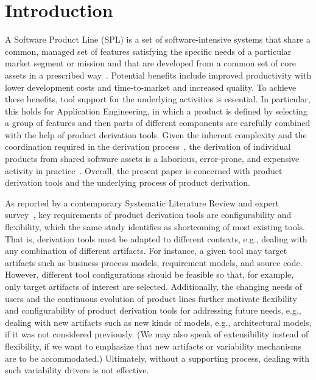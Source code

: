 
\section{Introduction}
\label{introduction}



A Software Product Line (SPL) is a set of software-intensive systems that share a common, managed set of features satisfying the specific needs of a particular market segment or mission and that are developed from a common set of core assets in a prescribed way~\cite{spl-book}. Potential benefits include improved productivity with lower development costs and time-to-market and increased quality. To achieve these benefits, tool support for the underlying activities is essential. In particular, this holds for Application Engineering, in which a product is defined by selecting a group of features and then parts of different components are carefully combined with the help of product derivation tools. Given the inherent complexity and the coordination required in the derivation process~\cite{griss}, the derivation of individual products from shared software assets is a laborious, error-prone, and expensive activity in practice~\cite{deelstra:2005}. Overall, the present paper is concerned with product derivation tools and the underlying process of product derivation.



As reported by a contemporary Systematic Literature Review and expert survey~\cite{ist-2010}, key requirements of product derivation tools are configurability and flexibility, which the same study identifies as shortcoming of most existing tools. That is, derivation tools must be adapted to different contexts, e.g., dealing with any combination of different artifacts. For instance, a given tool may target artifacts such as business process models, requirement models, and source code. However, different tool configurations should be feasible so that, for example, 
only target artifacts of interest are selected. Additionally, the changing needs of users and the continuous evolution of product lines further motivate flexibility and configurability of product derivation tools for addressing future needs, e.g., dealing with new artifacts such as new kinds of models, e.g., architectural models, if it was not considered previously. (We may also speak of extensibility instead of flexibility, if we want to emphasize that new artifacts or variability mechanisms are to be accommodated.) Ultimately, without a supporting process, dealing with such variability drivers is not effective.

